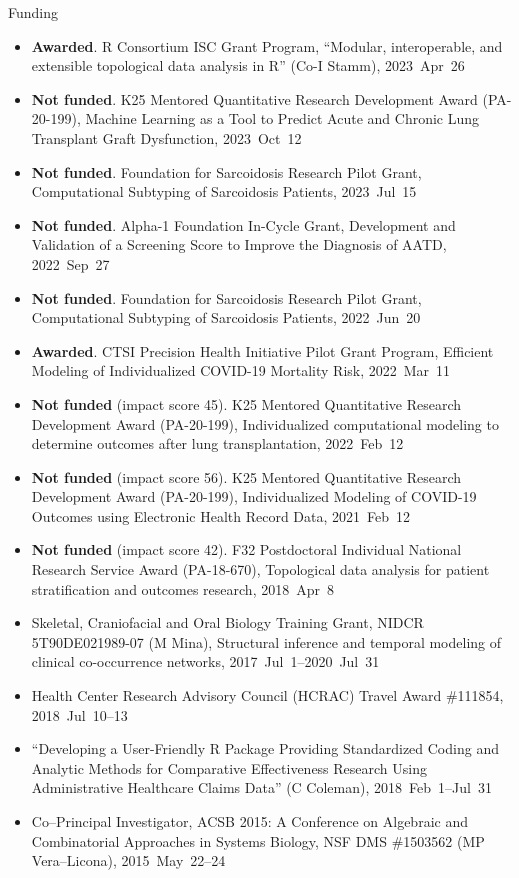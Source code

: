 \documentclass[10pt,a4paper]{article}
\begin{document}
\vspace{.25cm}
{\sc Funding}
\begin{itemize}[label=$\circ$,nolistsep]
\item
{\bfseries Awarded}. R Consortium ISC Grant Program, ``Modular, interoperable, and extensible topological data analysis in R'' (Co-I Stamm), 2023~Apr~26
\item
{\bfseries Not funded}. K25 Mentored Quantitative Research Development Award (PA-20-199), Machine Learning as a Tool to Predict Acute and Chronic Lung Transplant Graft Dysfunction, 2023~Oct~12
\item
{\bfseries Not funded}. Foundation for Sarcoidosis Research Pilot Grant, Computational Subtyping of Sarcoidosis Patients, 2023~Jul~15
\item
{\bfseries Not funded}. Alpha-1 Foundation In-Cycle Grant, Development and Validation of a Screening Score to Improve the Diagnosis of AATD, 2022~Sep~27
\item
{\bfseries Not funded}. Foundation for Sarcoidosis Research Pilot Grant, Computational Subtyping of Sarcoidosis Patients, 2022~Jun~20
\item
{\bfseries Awarded}. CTSI Precision Health Initiative Pilot Grant Program, Efficient Modeling of Individualized COVID-19 Mortality Risk, 2022~Mar~11
\item
{\bfseries Not funded} (impact score 45). K25 Mentored Quantitative Research Development Award (PA-20-199), Individualized computational modeling to determine outcomes after lung transplantation, 2022~Feb~12
\item
{\bfseries Not funded} (impact score 56). K25 Mentored Quantitative Research Development Award (PA-20-199), Individualized Modeling of COVID-19 Outcomes using Electronic Health Record Data, 2021~Feb~12
\item
{\bfseries Not funded} (impact score 42). F32 Postdoctoral Individual National Research Service Award (PA-18-670), Topological data analysis for patient stratification and outcomes
research, 2018~Apr~8
\item
Skeletal, Craniofacial and Oral Biology Training Grant, NIDCR 5T90DE021989-07 (M Mina), Structural inference and temporal modeling of clinical co-occurrence networks, 2017~Jul~1--2020~Jul~31
\item
Health Center Research Advisory Council (HCRAC) Travel Award \#111854, 2018~Jul~10--13
\item
``Developing a User-Friendly R Package Providing Standardized Coding and Analytic Methods for Comparative Effectiveness Research Using Administrative Healthcare Claims Data'' (C Coleman), 2018~Feb~1--Jul~31
\item
Co--Principal Investigator, ACSB 2015: A Conference on Algebraic and Combinatorial Approaches in Systems Biology, NSF DMS \#1503562 (MP Vera--Licona), 2015~May~22--24
\end{itemize}
\end{document}
